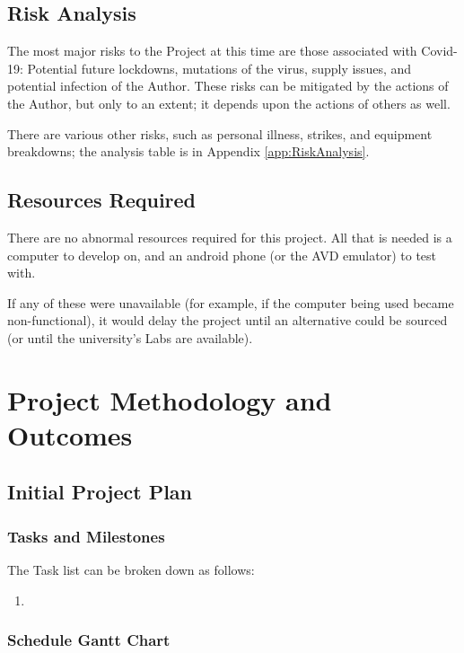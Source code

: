 \documentclass[11pt, a4paper, notitlepage]{report}
\begin{document}
\section{Risk Analysis}
The most major risks to the Project at this time are those associated with 
Covid-19: Potential future lockdowns, mutations of the virus, supply issues, 
and potential infection of the Author. These risks can be mitigated by the 
actions of the Author, but only to an extent; it depends upon the actions of 
others as well.

There are various other risks, such as personal illness, strikes, and equipment 
breakdowns; the analysis table is in Appendix \ref{app:RiskAnalysis}.

\section{Resources Required}
There are no abnormal resources required for this project. All that is needed 
is a computer to develop on, and an android phone (or the AVD emulator) to test 
with.

If any of these were unavailable (for example, if the computer being used 
became non-functional), it would delay the project until an alternative could 
be sourced (or until the university's Labs are available).

\chapter{Project Methodology and Outcomes}
\section{Initial Project Plan}
\subsection{Tasks and Milestones}
The Task list can be broken down as follows:
\begin{enumerate}
	\item 
\end{enumerate}

\subsection{Schedule Gantt Chart}\label{subsec:schedGanttCt}
\end{document}

